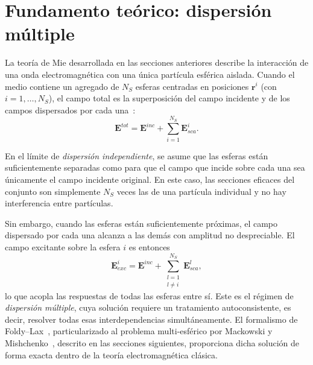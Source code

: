 \section{Fundamento teórico: dispersión múltiple}
\label{sec:fundamento multiple}
 
La teoría de Mie desarrollada en las secciones anteriores describe la
interacción de una onda electromagnética con una única partícula esférica
aislada. Cuando el medio contiene un agregado de $N_S$ esferas centradas
en posiciones $\mathbf{r}^i$ (con $i = 1,\ldots,N_S$), el campo total es
la superposición del campo incidente y de los campos dispersados por
cada una~\cite{Mackowski1991}:
\begin{equation}
  \mathbf{E}^{tot} = \mathbf{E}^{inc} + \sum_{i=1}^{N_S} \mathbf{E}_{sca}^{i}.
\end{equation}
 
En el límite de \textit{dispersión independiente}, se asume que las
esferas están suficientemente separadas como para que el campo que incide
sobre cada una sea únicamente el campo incidente original. En este caso,
las secciones eficaces del conjunto son simplemente $N_S$ veces las de
una partícula individual y no hay interferencia entre partículas.
 
Sin embargo, cuando las esferas están suficientemente próximas, el campo
dispersado por cada una alcanza a las demás con amplitud no despreciable.
El campo excitante sobre la esfera $i$ es entonces
\begin{equation}
  \mathbf{E}_{exc}^{i} = \mathbf{E}^{inc}
  + \sum_{\substack{l=1\\l\neq i}}^{N_S} \mathbf{E}_{sca}^{l},
\end{equation}
lo que acopla las respuestas de todas las esferas entre sí. Este es el
régimen de \textit{dispersión múltiple}, cuya solución requiere un
tratamiento autoconsistente, es decir,
resolver todas esas interdependencias simultáneamente. El formalismo de
Foldy--Lax~\cite{Foldy1945,Lax1951}, particularizado al problema
multi-esférico por Mackowski y Mishchenko~\cite{Mackowski1991,Mackowski1996}, descrito
en las secciones siguientes, proporciona dicha solución de forma exacta
dentro de la teoría electromagnética clásica.
 

